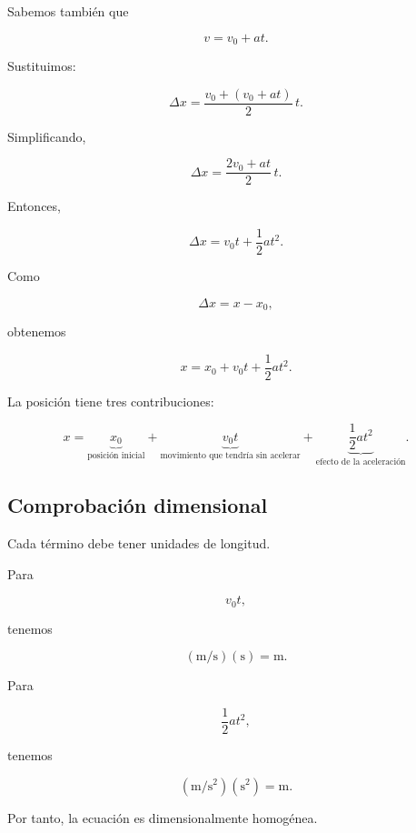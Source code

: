 Sabemos también que

\[ v=v_0+at. \]

Sustituimos:

\[
\Delta x
=
\frac{v_0+(v_0+at)}{2}\,t.
\]

Simplificando,

\[
\Delta x
=
\frac{2v_0+at}{2}\,t.
\]

Entonces,

\[ \boxed{\Delta x=v_0t+\frac{1}{2}at^2}. \]

Como

\[ \Delta x=x-x_0, \]

obtenemos

\[ \boxed{x=x_0+v_0t+\frac{1}{2}at^2}. \]

\begin{interpretacion}
La posición tiene tres contribuciones:

\[
x
=
\underbrace{x_0}_{\text{posición inicial}}
+
\underbrace{v_0t}_{\text{movimiento que tendría sin acelerar}}
+
\underbrace{\frac{1}{2}at^2}_{\text{efecto de la aceleración}}.
\]
\end{interpretacion}


\subsection{Comprobación dimensional}

Cada término debe tener unidades de longitud.

Para

\[ v_0t, \]

tenemos

\[
\left(\si{\meter\per\second}\right)
(\si{\second})
=
\si{\meter}.
\]

Para

\[ \frac{1}{2}at^2, \]

tenemos

\[
\left(\si{\meter\per\second\squared}\right)
(\si{\second\squared})
=
\si{\meter}.
\]

Por tanto, la ecuación es dimensionalmente homogénea.


